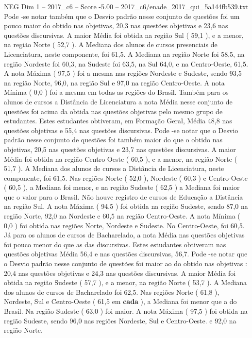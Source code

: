 \begin{textsample}{NEG Dim 1 – 2017\_c6 – Score -5.00 – 2017\_c6/enade\_2017\_qui\_5a144fb539.txt}
Pode -se notar também que o Desvio padrão nesse conjunto de questões foi um pouco maior do obtido nas objetivas, 20,3 nas questões objetivas e 23,6 nas questões discursivas.
A maior Média foi obtida na região Sul ( 59,1 ), e a menor, na região Norte ( 52,7 ).
A Mediana dos alunos de cursos presenciais de Licenciatura, neste componente, foi 61,5.
A Mediana na região Norte foi 58,5, na região Nordeste foi 60,3, na Sudeste foi 63,5, na Sul 64,0, e na Centro-Oeste, 61,5.
A nota Máxima ( 97,5 ) foi a mesma nas regiões Nordeste e Sudeste, sendo 93,5 na região Norte, 96,0, na região Sul e 97,0 na região Centro-Oeste.
A nota Mínima ( 0,0 ) foi a mesma em todas as regiões do Brasil.
Também para os alunos de cursos a Distância de Licenciatura a nota Média nesse conjunto de questões foi acima da obtida nas questões objetivas pelo mesmo grupo de estudantes.
Estes estudantes obtiveram, em Formação Geral, Média 48,8 nas questões objetivas e 55,4 nas questões discursivas.
Pode -se notar que o Desvio padrão nesse conjunto de questões foi também maior do que o obtido nas objetivas, 20,5 nas questões objetivas e 23,7 nas questões discursivas.
A maior Média foi obtida na região Centro-Oeste ( 60,5 ), e a menor, na região Norte ( 51,7 ).
A Mediana dos alunos de cursos a Distância de Licenciatura, neste componente, foi 61,5.
Nas regiões Norte ( 52,0 ), Nordeste ( 60,3 ) e Centro-Oeste ( 60,5 ), a Mediana foi menor, e na região Sudeste ( 62,5 ) a Mediana foi maior que o valor para o Brasil.
Não houve registro de cursos de Educação a Distância na região Sul.
A nota Máxima ( 94,5 ) foi obtida na região Sudeste, sendo 87,0 na região Norte, 92,0 na Nordeste e 60,5 na região Centro-Oeste.
A nota Mínima ( 0,0 ) foi obtida nas regiões Norte, Nordeste e Sudeste.
No Centro-Oeste, foi 60,5.
Já para os alunos de cursos de Bacharelado, a nota Média nas questões objetivas foi pouco menor do que as das discursivas.
Estes estudantes obtiveram nas questões objetivas Média 56,4 e nas questões discursivas, 56,7.
Pode -se notar que o Desvio padrão nesse conjunto de questões foi maior ao do obtido nas objetivas : 20,4 nas questões objetivas e 24,3 nas questões discursivas.
A maior Média foi obtida na região Sudeste ( 57,7 ), e a menor, na região Norte ( 53,7 ).
A Mediana dos alunos de cursos de Bacharelado foi 62,5.
Nas regiões Norte ( 61,8 ), Nordeste, Sul e Centro-Oeste ( 61,5 em \textbf{cada} ), a Mediana foi menor que a do Brasil.
Na região Sudeste ( 63,0 ) foi maior.
A nota Máxima ( 97,5 ) foi obtida na região Sudeste, sendo 96,0 nas regiões Nordeste, Sul e Centro-Oeste. e 92,0 na região Norte.

\end{textsample}
